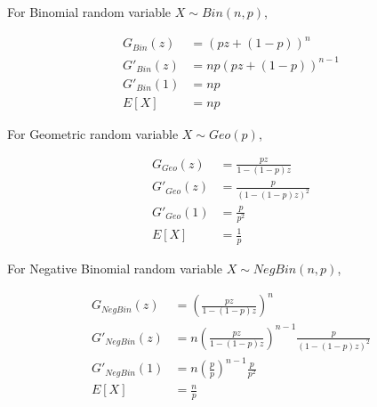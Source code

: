 For Binomial random variable $X \sim Bin(n, p)$,

\begin{align*}
    G_{Bin}(z) &= (pz + (1-p))^n \\
    G'_{Bin}(z) &= np(pz + (1-p))^{n-1} \\
    G'_{Bin}(1) &= np \\
    E[X] &= np
\end{align*}

\pagebreak

For Geometric random variable $X \sim Geo(p)$,

\begin{align*}
    G_{Geo}(z) &= \frac{pz}{1-(1-p)z} \\
    G'_{Geo}(z) &= \frac{p}{(1-(1-p)z)^2} \\
    G'_{Geo}(1) &= \frac{p}{p^2} \\
    E[X] &= \frac{1}{p}
\end{align*}

For Negative Binomial random variable $X \sim NegBin(n, p)$,

\begin{align*}
    G_{NegBin}(z) &= \left(\frac{pz}{1-(1-p)z}\right)^n \\
    G'_{NegBin}(z) &= n\left(\frac{pz}{1-(1-p)z}\right)^{n-1} \frac{p}{(1-(1-p)z)^2} \\
    G'_{NegBin}(1) &= n\left(\frac{p}{p}\right)^{n-1} \frac{p}{p^2} \\
    E[X] &= \frac{n}{p}
\end{align*}